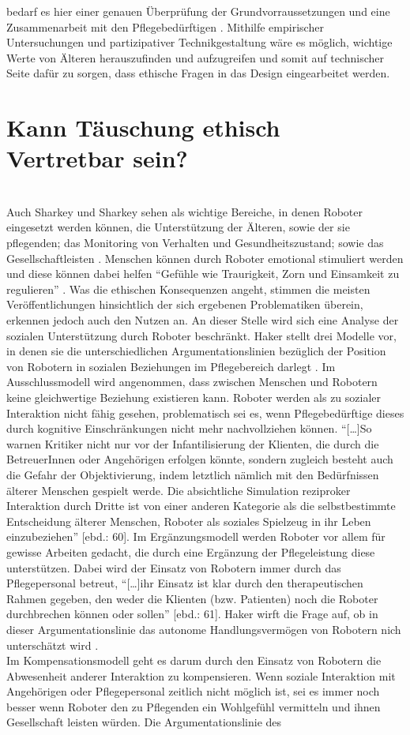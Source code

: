bedarf es hier einer genauen Überprüfung der Grundvorraussetzungen und eine Zusammenarbeit mit den Pflegebedürftigen \cite{sharky}\cite{kehl}. Mithilfe empirischer Untersuchungen und  partizipativer Technikgestaltung wäre es möglich, wichtige Werte von Älteren herauszufinden und aufzugreifen und somit auf technischer Seite dafür zu sorgen, dass ethische Fragen in das Design eingearbeitet werden. 

\section{Kann Täuschung ethisch Vertretbar sein?}
\label{sec:täuschung}
\\Auch Sharkey und Sharkey sehen als wichtige Bereiche, in denen Roboter eingesetzt werden können, die Unterstützung der Älteren, sowie der sie pflegenden; das Monitoring von Verhalten und Gesundheitszustand; sowie das Gesellschaftleisten \cite[ 27]{sharky}. Menschen können durch Roboter emotional stimuliert werden und diese können dabei helfen “Gefühle wie Traurigkeit, Zorn und Einsamkeit zu regulieren” \cite[58]{haker}. Was die ethischen Konsequenzen angeht, stimmen die meisten Veröffentlichungen hinsichtlich der sich ergebenen Problematiken überein, erkennen jedoch auch den Nutzen an. An dieser Stelle wird sich eine Analyse der sozialen Unterstützung durch Roboter beschränkt. Haker stellt drei Modelle vor, in denen sie die unterschiedlichen Argumentationslinien bezüglich der Position von Robotern in sozialen Beziehungen im Pflegebereich darlegt \cite[59 ff]{haker}. Im Ausschlussmodell wird angenommen, dass zwischen Menschen und Robotern keine gleichwertige Beziehung existieren kann. Roboter werden als zu sozialer Interaktion nicht fähig gesehen, problematisch sei es, wenn Pflegebedürftige dieses durch kognitive Einschränkungen nicht mehr nachvollziehen können. “[…]So warnen Kritiker nicht nur vor der Infantilisierung der Klienten, die durch die BetreuerInnen oder Angehörigen erfolgen könnte, sondern zugleich besteht auch die Gefahr der Objektivierung, indem letztlich nämlich mit den Bedürfnissen älterer Menschen gespielt werde. Die absichtliche Simulation reziproker Interaktion durch Dritte ist von einer anderen Kategorie als die selbstbestimmte Entscheidung älterer Menschen, Roboter als soziales Spielzeug in ihr Leben einzubeziehen” [ebd.: 60]. Im Ergänzungsmodell werden Roboter vor allem für gewisse Arbeiten gedacht, die durch eine Ergänzung der Pflegeleistung diese unterstützen. Dabei wird der Einsatz von Robotern immer durch das Pflegepersonal betreut, “[…]ihr Einsatz ist klar durch den therapeutischen Rahmen gegeben, den weder die Klienten (bzw. Patienten) noch die Roboter durchbrechen können oder sollen” [ebd.: 61]. Haker wirft die Frage auf, ob in dieser Argumentationslinie das autonome Handlungsvermögen von Robotern nich unterschätzt wird \cite{haker}.\\ Im Kompensationsmodell geht es darum durch den Einsatz von Robotern die Abwesenheit anderer Interaktion zu kompensieren. Wenn soziale Interaktion mit Angehörigen oder Pflegepersonal zeitlich nicht möglich ist, sei es immer noch besser wenn Roboter den zu Pflegenden ein Wohlgefühl vermitteln und ihnen Gesellschaft leisten würden. Die Argumentationslinie des 